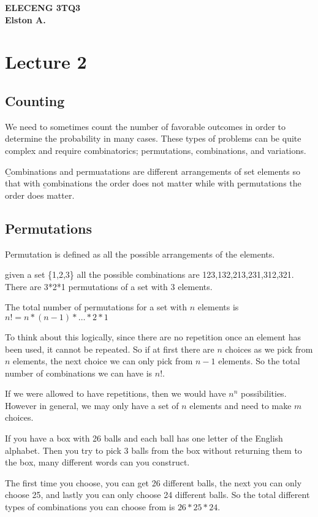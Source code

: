 \documentclass[12pt, titlepage, oneside]{article}
\begin{document}
	
	\textbf{ELECENG 3TQ3}\\
	\textbf{Elston A.}

\section{Lecture 2}
\subsection{Counting}

We need to sometimes count the number of favorable outcomes in order to determine the probability in many cases. These types of problems can be quite complex and require combinatorics; permutations, combinations, and variations.

\b{Combinations and permuatations} are different arrangements of set elements so that with \b{combinations the order does not matter} while with \b{permutations the order does matter}.

\subsection{Permutations}


Permutation is defined as all the possible arrangements of the elements. 

\ex given a set \{1,2,3\} all the possible combinations are 123,132,213,231,312,321. There are 3*2*1 permutations of a set with 3 elements. 

The total number of permutations for a set with $n$ elements is $n! = n * (n-1) * \dots * 2 * 1$ 

To think about this logically, since there are no repetition once an element has been used, it cannot be repeated. So if at first there are $n$ choices as we pick from $n$ elements, the next choice we can only pick from $n-1$ elements. So the total number of combinations we can have is $n!$.

If we were allowed to have repetitions, then we would have $n^n$ possibilities. However in general, we may only have a set of $n$ elements and need to make $m$ choices.

\ex If you have a box with 26 balls and each ball has one letter of the English alphabet. Then you try to pick 3 balls from the box without returning them to the box, many different words can you construct.

The first time you choose, you can get 26 different balls, the next you can only choose 25, and lastly you can only choose 24 different balls. So the total different types of combinations you can choose from is $26*25*24$.
\end{document}
